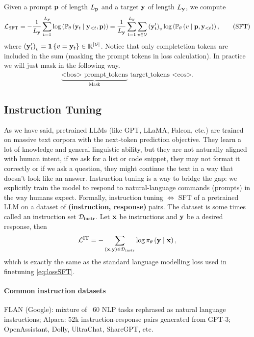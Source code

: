 \documentclass[11pt]{article}  %
\begin{document}
Given a prompt $\mathbf{p}$ of length $L_{\mathbf{p}}$ and a target $\mathbf{y}$ of length $L_{\mathbf{y}}$, we compute 
\begin{align}
  \label{eq:lossSFT}
  \mathcal{L}_{\text{SFT}} = -\frac{1}{L_{\mathbf{y}}} \sum_{t=1}^{L_{\mathbf{y}}} \log \left( \mathbb{P}_{\theta}\left( \mathbf{y}_t \mid \mathbf{y}_{< t}, \mathbf{p} \right) \right) = \frac{1}{L_{\mathbf{y}}}\sum_{t=1}^{L_{\mathbf{y}}}\sum_{v \in \mathcal{V}}\left( \mathbf{y}^\prime_t \right)_v\log\left( \mathbb{P}_{\theta}\left( v \mid \mathbf{p}, \mathbf{y}_{< t} \right) \right), \tag{SFT}
\end{align}
where $\left( \mathbf{y}^\prime_t \right)_v = \mathbf{1}\left\{ v = \mathbf{y}_t \right\} \in \mathbb{R}^{\lvert\mathcal{V}\rvert}$.
Notice that only completetion tokens are included in the sum (masking the prompt tokens in loss calculation).
In practice we will just mask in the following way.
\begin{align*}
  \underbrace{\text{<bos>  } \text{prompt\_tokens}}_{\text{Mask}} \text{ target\_tokens } \text{<eos>}. 
\end{align*}






\subsection{Instruction Tuning}
As we have said, pretrained LLMs (like GPT, LLaMA, Falcon, etc.) are trained on massive text corpora with the next-token prediction objective.
They learn a lot of knowledge and general linguistic ability, but they are not naturally aligned with human intent, if we ask for a list or code snippet, they may not format it correctly or if we ask a question, they might continue the text in a way that doesn't look like an answer.
Instruction tuning is a way to bridge the gap: we explicitly train the model to respond to natural-language commands (prompts) in the way humans expect.
Formally, instruction tuning $\iff$ SFT of a pretrained LLM on a dataset of \textbf{(instruction, response)} pairs.
The dataset is some times called an instruction set $\mathcal{D}_{\text{instr}}$.
Let $\mathbf{x}$ be instructions and $\mathbf{y}$ be a desired response, then 
\begin{align*}
  \mathcal{L}^{\text{IT}} = - \sum_{(\mathbf{x}, \mathbf{y}) \in \mathcal{D}_{\text{instr}}} \log \pi_{\theta}\left( \mathbf{y} \mid \mathbf{x} \right),
\end{align*}
which is exactly the same as the standard language modelling loss used in finetuning \eqref{eq:lossSFT}.

\paragraph{Common instruction datasets} 
FLAN (Google): mixture of ~60 NLP tasks rephrased as natural language instructions; Alpaca: 52k instruction-response pairs generated from GPT-3;
OpenAssistant, Dolly, UltraChat, ShareGPT, etc.
\end{document}
